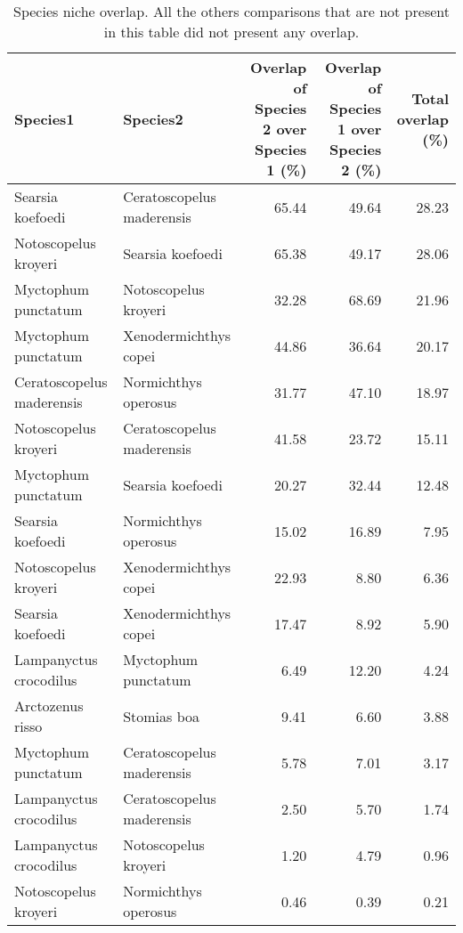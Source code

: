 \begin{table}[ht]
\centering
\caption{Species niche overlap. All the others comparisons that are not present in this table did not present any overlap.}
\label{table:ell_ovlp}
\begin{adjustbox}{max width=1.1\textwidth,center}
\begin{tabular}{llrrr}
  \hline
Species1 & Species2 & Overlap of Species 2 over Species 1 (\%) & Overlap of Species 1 over Species 2 (\%) & Total overlap (\%)\\ 
  \hline
Searsia koefoedi & Ceratoscopelus maderensis & 65.44 & 49.64 & 28.23 \\ 
  Notoscopelus kroyeri & Searsia koefoedi & 65.38 & 49.17 & 28.06 \\ 
  Myctophum punctatum & Notoscopelus kroyeri & 32.28 & 68.69 & 21.96 \\ 
  Myctophum punctatum & Xenodermichthys copei & 44.86 & 36.64 & 20.17 \\ 
  Ceratoscopelus maderensis & Normichthys operosus & 31.77 & 47.10 & 18.97 \\ 
  Notoscopelus kroyeri & Ceratoscopelus maderensis & 41.58 & 23.72 & 15.11 \\ 
  Myctophum punctatum & Searsia koefoedi & 20.27 & 32.44 & 12.48 \\ 
  Searsia koefoedi & Normichthys operosus & 15.02 & 16.89 & 7.95 \\ 
  Notoscopelus kroyeri & Xenodermichthys copei & 22.93 & 8.80 & 6.36 \\ 
  Searsia koefoedi & Xenodermichthys copei & 17.47 & 8.92 & 5.90 \\ 
  Lampanyctus crocodilus & Myctophum punctatum & 6.49 & 12.20 & 4.24 \\ 
  Arctozenus risso & Stomias boa & 9.41 & 6.60 & 3.88 \\ 
  Myctophum punctatum & Ceratoscopelus maderensis & 5.78 & 7.01 & 3.17 \\ 
  Lampanyctus crocodilus & Ceratoscopelus maderensis & 2.50 & 5.70 & 1.74 \\ 
  Lampanyctus crocodilus & Notoscopelus kroyeri & 1.20 & 4.79 & 0.96 \\ 
  Notoscopelus kroyeri & Normichthys operosus & 0.46 & 0.39 & 0.21 \\ 
   \hline
\end{tabular}
\end{adjustbox}
\end{table}



